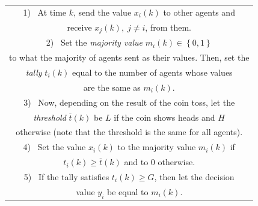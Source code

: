 \documentclass[12pt]{article}
\begin{document}
			\begin{center}
				\begin{tabular}{||c||} 
					\hline
					1) \, At time $k$, send the value $x_{i}(k)$ to other agents and \\
					receive $x_{j}(k), \; j\neq i$, from them.\\ [0.5ex] 
					\hline
					2) \, Set the \textit{majority value} $m_{i}(k)\in \left\{ 0,1 \right\}$ \\
					to what the
					majority of agents sent as their values. Then, set the\\
					\textit{tally} $t_{i}(k)$ equal to the number of agents whose values\\
					are the same as $m_{i}(k)$.\\ 
					\hline
					3) \, Now, depending on the result of the coin toss, let the\\
					\textit{threshold} $\overline{t}(k)$ be $L$ if the coin shows
					heads and $H$\\
					otherwise (note that the threshold is the same for all
					agents).\\
					\hline
					4) \, Set the value $x_{i}(k)$ to the majority value $m_{i}(k)$ if\\
					$t_{i}(k) \ge \overline{t}(k)$ and to 0 otherwise.\\
					\hline
					5) \, If the tally satisfies $t_{i}(k) \ge G$, then let the decision\\
					value $y_{i}$ be equal to $m_{i}(k)$.\\
					\hline
				\end{tabular}
			\end{center}

\end{document}
